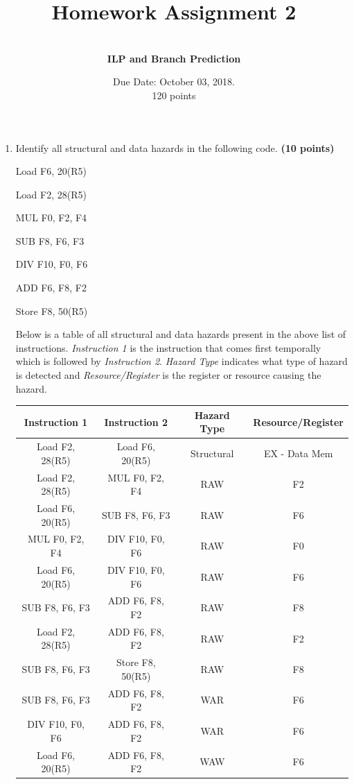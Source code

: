 \documentclass[a4paper, 11pt]{exam}
\title{Homework Assignment 2}
\subtitle{CS/ECE 6810: Computer Architecture \\
September 26,2018
\\
Name: Jake Pitkin

UID: u0891770 }
\author{ \\
\textbf{ILP and Branch Prediction}}
\date{Due Date: October 03, 2018.\\
120 points}
\begin{document}
\maketitle
\begin{center}

\begin{enumerate}
	

\begin{enumerate}

\item Identify all structural and data hazards in the following code. \textbf {(10 points)}


\begin {center}
Load F6, 20(R5) 

Load F2, 28(R5)

MUL F0, F2, F4

SUB F8, F6, F3

DIV F10, F0, F6

ADD F6, F8, F2

Store F8, 50(R5)

\end {center}
 
Below is a table of all structural and data hazards present in the above list of instructions. \textit{Instruction 1} is the instruction that comes first temporally which is followed by \textit{Instruction 2}. \textit{Hazard Type} indicates what type of hazard is detected and \textit{Resource/Register} is the register or resource causing the hazard.

\begin{center}
\begin{tabular}{ |c|c|c|c| } 
 \hline
  \textbf{Instruction 1} & \textbf{Instruction 2} & \textbf{Hazard Type} & \textbf{Resource/Register} \\ 
  \hline
 Load F2, 28(R5) & Load F6, 20(R5) & Structural & EX - Data Mem\\ \hline
 Load F2, 28(R5) & MUL F0, F2, F4 & RAW & F2\\ \hline
 Load F6, 20(R5) & SUB F8, F6, F3 & RAW & F6\\ \hline
 MUL F0, F2, F4 & DIV F10, F0, F6 & RAW & F0 \\ \hline
 Load F6, 20(R5) & DIV F10, F0, F6 & RAW & F6 \\ \hline
 SUB F8, F6, F3 & ADD F6, F8, F2 & RAW & F8\\ \hline
 Load F2, 28(R5) & ADD F6, F8, F2 & RAW & F2\\ \hline
 SUB F8, F6, F3 & Store F8, 50(R5) & RAW & F8\\ \hline
 SUB F8, F6, F3 & ADD F6, F8, F2 & WAR & F6\\ \hline
 DIV F10, F0, F6 & ADD F6, F8, F2 & WAR & F6\\ \hline
 Load F6, 20(R5) & ADD F6, F8, F2 & WAW & F6\\ \hline
\end{tabular}
\end{center}


\end{enumerate}
\end{enumerate}
\end{center}
\end{document}
